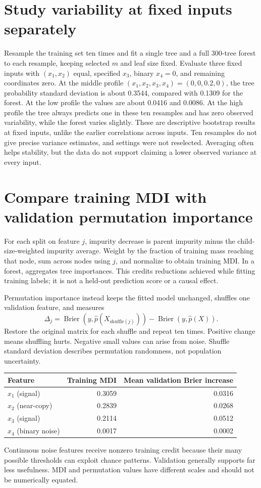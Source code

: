\section{Study variability at fixed inputs separately}
Resample the training set ten times and fit a single tree and a full 300-tree forest to each resample, keeping selected $m$ and leaf size fixed. Evaluate three fixed inputs with $(x_1,x_2)$ equal, specified $x_3$, binary $x_4=0$, and remaining coordinates zero.
At the middle profile $(x_1,x_2,x_3,x_4)=(0,0,0.2,0)$, the tree probability standard deviation is about 0.3544, compared with 0.1309 for the forest. At the low profile the values are about 0.0416 and 0.0086. At the high profile the tree always predicts one in these ten resamples and has zero observed variability, while the forest varies slightly.
These are descriptive bootstrap results at fixed inputs, unlike the earlier correlations across inputs. Ten resamples do not give precise variance estimates, and settings were not reselected. Averaging often helps stability, but the data do not support claiming a lower observed variance at every input.

\section{Compare training MDI with validation permutation importance}
For each split on feature $j$, impurity decrease is parent impurity minus the child-size-weighted impurity average. Weight by the fraction of training mass reaching that node, sum across nodes using $j$, and normalize to obtain training MDI. In a forest,  aggregates tree importances. This credits reductions achieved while fitting training labels; it is not a held-out prediction score or a causal effect.

Permutation importance instead keeps the fitted model unchanged, shuffles one validation feature, and measures
\[\Delta_j=\operatorname{Brier}(y,\hat p(X_{\mathrm{shuffle}(j)}))-
\operatorname{Brier}(y,\hat p(X)).\]
Restore the original matrix for each shuffle and repeat ten times. Positive change means shuffling hurts. Negative small values can arise from noise. Shuffle standard deviation describes permutation randomness, not population uncertainty.
\begin{center}
\begin{tabular}{lrr}\toprule
Feature&Training MDI&Mean validation Brier increase\\\midrule
$x_1$ (signal)&0.3059&0.0316\\
$x_2$ (near-copy)&0.2839&0.0268\\
$x_3$ (signal)&0.2114&0.0512\\
$x_4$ (binary noise)&0.0017&0.0002\\\bottomrule
\end{tabular}
\end{center}
Continuous noise features receive nonzero training credit because their many possible thresholds can exploit chance patterns. Validation generally supports far less usefulness. MDI and permutation values have different scales and should not be numerically equated.

